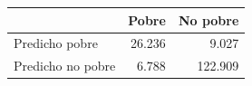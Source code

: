 
\begin{tabular}{lrr}
\toprule
  & Pobre & No pobre\\
\midrule
Predicho pobre & 26.236 & 9.027\\
Predicho no pobre & 6.788 & 122.909\\
\bottomrule
\end{tabular}
